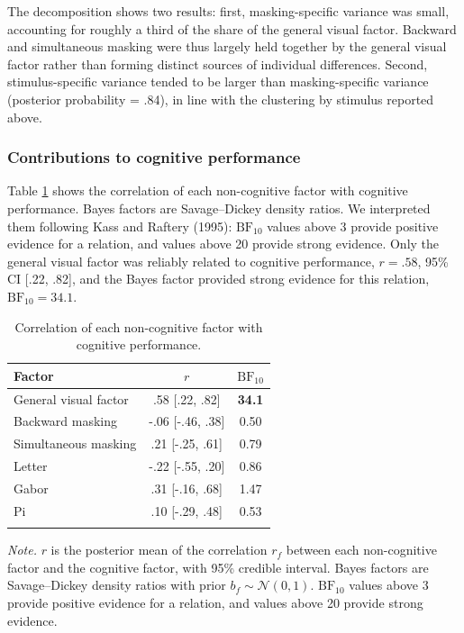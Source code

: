 \documentclass[
  ,man]{apa6}
\begin{document}
The decomposition shows two results: first, masking-specific variance was small, accounting for roughly a third of the share of the general visual factor. Backward and simultaneous masking were thus largely held together by the general visual factor rather than forming distinct sources of individual differences. Second, stimulus-specific variance tended to be larger than masking-specific variance (posterior probability = .84), in line with the clustering by stimulus reported above.

\subsubsection{Contributions to cognitive performance}\label{contributions-to-cognitive-performance}

Table \ref{tab:tab-cor} shows the correlation of each non-cognitive factor with cognitive performance. Bayes factors are Savage--Dickey density ratios. We interpreted them following Kass and Raftery (1995): \(\text{BF}_{10}\) values above 3 provide positive evidence for a relation, and values above 20 provide strong evidence. Only the general visual factor was reliably related to cognitive performance, \(r = .58\), 95\% CI {[}.22, .82{]}, and the Bayes factor provided strong evidence for this relation, \(\text{BF}_{10} = 34.1\).

\begin{table}[tbp]

\begin{center}
\begin{threeparttable}

\caption{\label{tab:tab-cor}Correlation of each non-cognitive factor with cognitive performance.}

\begin{tabular}{lcc}
\toprule
Factor & \multicolumn{1}{c}{$r$} & \multicolumn{1}{c}{$\text{BF}_{10}$}\\
\midrule
General visual factor & .58 [.22, .82] & \textbf{34.1}\\
Backward masking & -.06 [-.46, .38] & 0.50\\
Simultaneous masking & .21 [-.25, .61] & 0.79\\
Letter & -.22 [-.55, .20] & 0.86\\
Gabor & .31 [-.16, .68] & 1.47\\
Pi & .10 [-.29, .48] & 0.53\\
\bottomrule
\addlinespace
\end{tabular}

\begin{tablenotes}[para]
\normalsize{\textit{Note.} $r$ is the posterior mean of the correlation $r_f$ between each non-cognitive factor and the cognitive factor, with 95\% credible interval. Bayes factors are Savage--Dickey density ratios with prior $b_f \sim \mathcal{N}(0, 1)$. $\text{BF}_{10}$ values above 3 provide positive evidence for a relation, and values above 20 provide strong evidence.}
\end{tablenotes}

\end{threeparttable}
\end{center}

\end{table}
\end{document}
